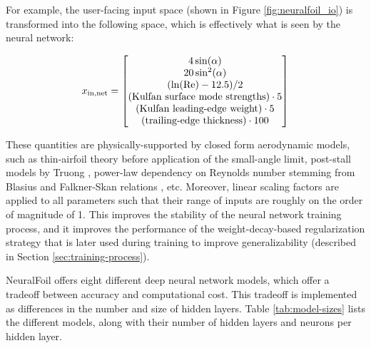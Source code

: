 \documentclass[conf]{new-aiaa}
\begin{document}
    For example, the user-facing input space (shown in Figure \ref{fig:neuralfoil_io}) is transformed into the following space, which is effectively what is seen by the neural network:

    \begin{equation}
        x_{\rm in,net} = \begin{bmatrix}
                             4 \sin(\alpha)                                 \\
                             20 \sin^2(\alpha)    \\
                             (\ln(\rm Re) - 12.5) / 2 \\
                             (\text{Kulfan surface mode strengths}) \cdot 5             \\
                             (\text{Kulfan leading-edge weight}) \cdot 5    \\
                             (\text{trailing-edge thickness}) \cdot 100     \\
        \end{bmatrix}
    \end{equation}

    \noindent These quantities are physically-supported by closed form aerodynamic models, such as thin-airfoil theory before application of the small-angle limit, post-stall models by Truong \cite{truong_analytical_2020}, power-law dependency on Reynolds number stemming from Blasius and Falkner-Skan relations \cite{drela_aerodynamics_2019}, etc. Moreover, linear scaling factors are applied to all parameters such that their range of inputs are roughly on the order of magnitude of 1. This improves the stability of the neural network training process, and it improves the performance of the weight-decay-based regularization strategy that is later used during training to improve generalizability (described in Section \ref{sec:training-process}).

    NeuralFoil offers eight different deep neural network models, which offer a tradeoff between accuracy and computational cost. This tradeoff is implemented as differences in the number and size of hidden layers. Table \ref{tab:model-sizes} lists the different models, along with their number of hidden layers and neurons per hidden layer.
\end{document}
